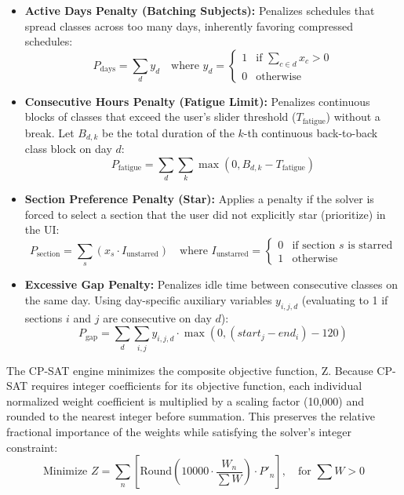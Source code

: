 \documentclass{icsthesis}
\begin{document}
\begin{mainmatter}
\begin{itemize}
			\item \textbf{Active Days Penalty (Batching Subjects):} Penalizes schedules that spread classes across too many days, inherently favoring compressed schedules:
			\begin{equation}
			P_{\text{days}} = \sum_{d} y_d \quad \text{where } y_d = \begin{cases} 1 & \text{if } \sum_{c \in d} x_c > 0 \\ 0 & \text{otherwise} \end{cases}
			\end{equation}

			\item \textbf{Consecutive Hours Penalty (Fatigue Limit):} Penalizes continuous blocks of classes that exceed the user's slider threshold ($T_{\text{fatigue}}$) without a break. Let $B_{d, k}$ be the total duration of the $k$-th continuous back-to-back class block on day $d$:
			\begin{equation}
			P_{\text{fatigue}} = \sum_{d} \sum_{k} \max\left(0, B_{d, k} - T_{\text{fatigue}}\right)
			\end{equation}

			\item \textbf{Section Preference Penalty (Star):} Applies a penalty if the solver is forced to select a section that the user did not explicitly star (prioritize) in the UI:
			\begin{equation}
			P_{\text{section}} = \sum_{s} (x_s \cdot I_{\text{unstarred}}) \quad \text{where } I_{\text{unstarred}} = \begin{cases} 0 & \text{if section } s \text{ is starred} \\ 1 & \text{otherwise} \end{cases}
			\end{equation}
			
			\item \textbf{Excessive Gap Penalty:} Penalizes idle time between consecutive classes on the same day. Using day-specific auxiliary variables $y_{i,j,d}$ (evaluating to 1 if sections $i$ and $j$ are consecutive on day $d$):
			\begin{equation}
			P_{\text{gap}} = \sum_{d} \sum_{i,j} y_{i,j,d} \cdot \max(0, (start_{j} - end_i) - 120)
			\end{equation}
		\end{itemize}

		The CP-SAT engine minimizes the composite objective function, Z. Because CP-SAT requires integer coefficients for its objective function, each individual normalized weight coefficient is multiplied by a scaling factor (10,000) and rounded to the nearest integer before summation. This preserves the relative fractional importance of the weights while satisfying the solver's integer constraint:
		\begin{equation}
		\text{Minimize } Z = \sum_{n} \left[ \text{Round}\left(10000 \cdot \frac{W_n}{\sum W}\right) \cdot P'_n \right], \quad \text{for } \sum W > 0
		\end{equation}
		

\end{mainmatter}
\end{document}
